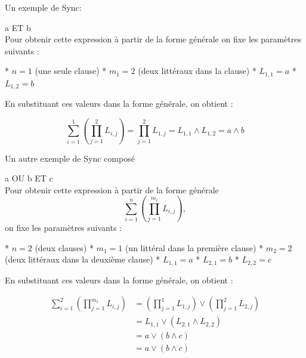 \documentclass{beamer}
\begin{document}
\begin{frame}{Un exemple de Sync:}

\begin{examples}
\ex a ET b \\
\footnotesize Pour obtenir cette expression à partir de la forme générale on fixe les paramètres suivants :

* $n = 1$ (une seule clause)
* $m_1 = 2$ (deux littéraux dans la clause)
* $L_{1,1} = a$
* $L_{1,2} = b$

En substituant ces valeurs dans la forme générale, on obtient :

\[\sum_{i=1}^{1} \left( \prod_{j=1}^{2} L_{i,j} \right) = \prod_{j=1}^{2} L_{1,j} = L_{1,1} \land L_{1,2} = a \land b\]
\end{examples}
    
\end{frame}

\begin{frame}{Un autre exemple de Sync composé}
\begin{examples}
\ex a OU b ET c \\
\footnotesize Pour obtenir cette expression à partir de la forme générale 
\[\sum_{i=1}^{n} \left( \prod_{j=1}^{m_i} L_{i,j} \right),\] 
on fixe les paramètres suivants :

* $n = 2$ (deux clauses)
* $m_1 = 1$ (un littéral dans la première clause)
* $m_2 = 2$ (deux littéraux dans la deuxième clause)
* $L_{1,1} = a$
* $L_{2,1} = b$
* $L_{2,2} = c$

En substituant ces valeurs dans la forme générale, on obtient :

\begin{align*}
\sum_{i=1}^{2} \left( \prod_{j=1}^{m_i} L_{i,j} \right) &= \left( \prod_{j=1}^{1} L_{1,j} \right) \lor \left( \prod_{j=1}^{2} L_{2,j} \right) \\
&= L_{1,1} \lor (L_{2,1} \land L_{2,2}) \\
&= a \lor (b \land c) \\
&= a \lor (b \land c)
\end{align*}
\end{examples}
\end{frame}
\end{document}
